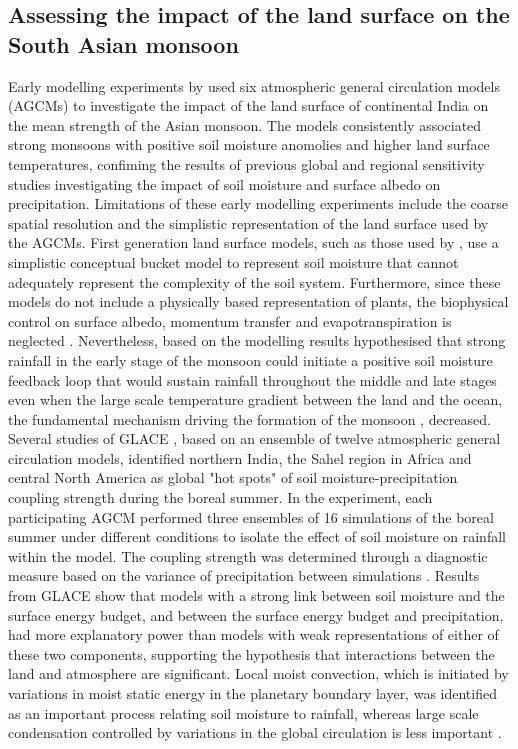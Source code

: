 \documentclass{icldt}\usepackage[]{graphicx}\usepackage[]{color}
\begin{document}
\subsection{Assessing the impact of the land surface on the South Asian monsoon}
Early modelling experiments by \citet{Meehl1994} used six atmospheric general circulation models (AGCMs) to investigate the impact of the land surface of continental India on the mean strength of the Asian monsoon. The models consistently associated strong monsoons with positive soil moisture anomolies and higher land surface temperatures, confiming the results of previous global and regional sensitivity studies investigating the impact of soil moisture \citep{Walker1977,Shukla1982,Sud1985} and surface albedo \citep{Charney1977,Sud1985} on precipitation. Limitations of these early modelling experiments include the coarse spatial resolution and the simplistic representation of the land surface used by the AGCMs. First generation land surface models, such as those used by \citet{Meehl1994}, use a simplistic conceptual bucket model to represent soil moisture that cannot adequately represent the complexity of the soil system. Furthermore, since these models do not include a physically based representation of plants, the biophysical control on surface albedo, momentum transfer and evapotranspiration is neglected \citep{Sellers1997}. Nevertheless, based on the modelling results \citet{Meehl1994} hypothesised that strong rainfall in the early stage of the monsoon could initiate a positive soil moisture feedback loop that would sustain rainfall throughout the middle and late stages even when the large scale temperature gradient between the land and the ocean, the fundamental mechanism driving the formation of the monsoon \citep{Turner2012}, decreased. \\

Several studies of GLACE \citep{Koster2004,Koster2006,Guo2006}, based on an ensemble of twelve atmospheric general circulation models, identified northern India, the Sahel region in Africa and central North America as global "hot spots" of soil moisture-precipitation coupling strength during the boreal summer. In the experiment, each participating AGCM performed three ensembles of 16 simulations of the boreal summer under different conditions to isolate the effect of soil moisture on rainfall within the model. The coupling strength was determined through a diagnostic measure based on the variance of precipitation between simulations \citep{Koster2002}. Results from GLACE show that models with a strong link between soil moisture and the surface energy budget, and between the surface energy budget and precipitation, had more explanatory power than models with weak representations of either of these two components, supporting the hypothesis that interactions between the land and atmosphere are significant. Local moist convection, which is initiated by variations in moist static energy in the planetary boundary layer, was identified as an important process relating soil moisture to rainfall, whereas large scale condensation controlled by variations in the global circulation is less important \citep{Guo2006}. \\
\end{document}
